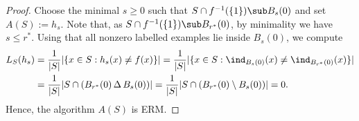 \documentclass[12pt]{article}
\begin{document}
\begin{proof}
  Choose the minimal $ s\geq 0 $ such that $ S\cap f^{-1}(\{1\}) \sub B_{s}(0)$ and set $ A(S) := h_{s} $. Note that, as $ S\cap f^{-1}(\{1\})\sub B_{r^{*}}(0) $, by minimality we have $ s\leq r^{*} $. Using that all nonzero labelled examples lie inside $ B_{s}(0) $, we compute
  \begin{align*}
    L_{S}(h_{s}) &= \frac{1}{|S|}|\{x\in S : h_{s}(x) \neq f(x)\}| = \frac{1}{|S|} |\{x\in S: \ind_{B_{s}(0)}(x) \neq \ind_{B_{r^{*}}(0)}(x)\}| \\
    &= \frac{1}{|S|} | S\cap (B_{r^{*}}(0)\, \Delta \, B_{s}(0))| = \frac{1}{|S|} | S\cap (B_{r^{*}}(0)\setminus B_{s}(0))| = 0.
  \end{align*}
  Hence, the algorithm $ A(S) $ is ERM.


\end{proof}
\end{document}
